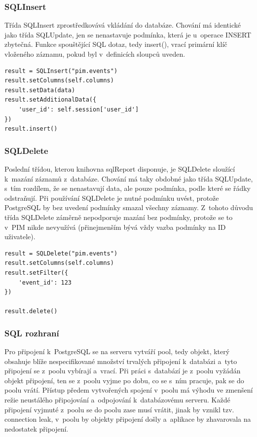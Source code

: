 \documentclass[bc,male,html,dept460]{diploma}				%
\begin{document}
\subsubsection{SQLInsert}
Třída SQLInsert zprostředkovává vkládání do databáze. Chování má identické jako třída SQLUpdate, jen se nenastavuje podmínka, která je u~operace INSERT zbytečná. Funkce spouštějící SQL dotaz, tedy insert(), vrací primární klíč vloženého záznamu, pokud byl v~definicích sloupců uveden.

\bigskip
\begin{lstlisting}[label=src:Python,caption=Ukázka použití třídy SQLInsert]
result = SQLInsert("pim.events")
result.setColumns(self.columns)
result.setData(data)
result.setAdditionalData({
	'user_id': self.session['user_id']
})
result.insert()

\end{lstlisting}

\subsubsection{SQLDelete}
Poslední třídou, kterou knihovna sqlReport disponuje, je SQLDelete sloužící k~mazání záznamů z~databáze.
Chování má taky obdobné jako třída SQLUpdate, s~tím rozdílem, že se nenastavují data, ale pouze podmínka, podle které se řádky odstraňují.
Při používání SQLDelete je nutné podmínku uvést, protože PostgreSQL by bez uvedení podmínky smazal všechny záznamy. Z~tohoto důvodu třída SQLDelete záměrně nepodporuje mazání bez podmínky, protože se to v~PIM nikde nevyužívá (přinejmenším bývá vždy vazba podmínky na ID uživatele).

\bigskip
\begin{lstlisting}[label=src:Python,caption=Ukázka použití třídy SQLDelete]
result = SQLDelete("pim.events")
result.setColumns(self.columns)
result.setFilter({
	'event_id': 123
})

result.delete()
\end{lstlisting}

\subsubsection{SQL rozhraní}
Pro připojení k~PostgreSQL se na serveru vytváří pool, tedy objekt, který obsahuje blíže nespecifikované množství trvalých připojení k~databázi a~tyto připojení se z~poolu vybírají a~vrací.
Při práci s~databází je z~poolu vyžádán objekt připojení, ten se z~poolu vyjme po dobu, co se s~ním pracuje, pak se do poolu vrátí.
Přístup předem vytvořených spojení v~poolu má výhodu ve zmenšení režie neustálého připojování a~odpojování k~databázovému serveru.
Každé připojení vyjmuté z~poolu se do poolu zase musí vrátit, jinak by vznikl tzv. connection leak, v~poolu by objekty připojení došly a~aplikace by zhavarovala na nedostatek připojení.
\end{document}
